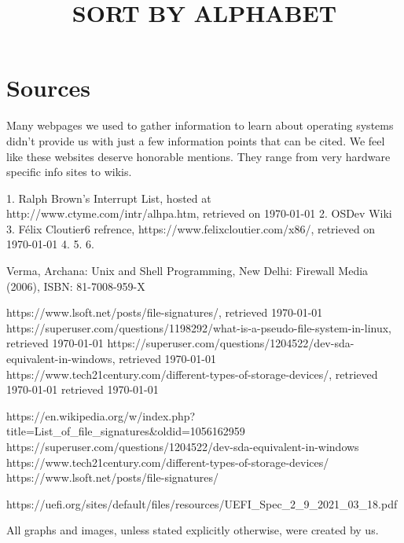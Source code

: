 \section{Sources}

Many webpages we used to gather information to learn about operating systems didn't provide us with
just a few information points that can be cited. We feel like these websites deserve honorable
mentions. They range from very hardware specific info sites to wikis.

\title{SORT BY ALPHABET}

1. Ralph Brown's Interrupt List, hosted at http://www.ctyme.com/intr/alhpa.htm, retrieved on \today
2. OSDev Wiki
3. Félix Cloutier6 refrence, https://www.felixcloutier.com/x86/, retrieved on \today
4. 
5.
6.

\begin{thebibliography}{10}
	Verma, Archana: Unix and Shell Programming,
	New Delhi: Firewall Media (2006),
	ISBN: 81-7008-959-X

	https://www.lsoft.net/posts/file-signatures/,
	retrieved \today
{}
	https://superuser.com/questions/1198292/what-is-a-pseudo-file-system-in-linux,
	retrieved \today
{}
	https://superuser.com/questions/1204522/dev-sda-equivalent-in-windows,
	retrieved \today
{}
	https://www.tech21century.com/different-types-of-storage-devices/,
	retrieved \today
{}
        retrieved \today
\end{thebibliography}


https://en.wikipedia.org/w/index.php?title=List\_of\_file\_signatures&oldid=1056162959
https://superuser.com/questions/1204522/dev-sda-equivalent-in-windows
https://www.tech21century.com/different-types-of-storage-devices/
https://www.lsoft.net/posts/file-signatures/

https://uefi.org/sites/default/files/resources/UEFI\_Spec\_2\_9\_2021\_03\_18.pdf

%
All graphs and images, unless stated explicitly otherwise, were created by us. 
